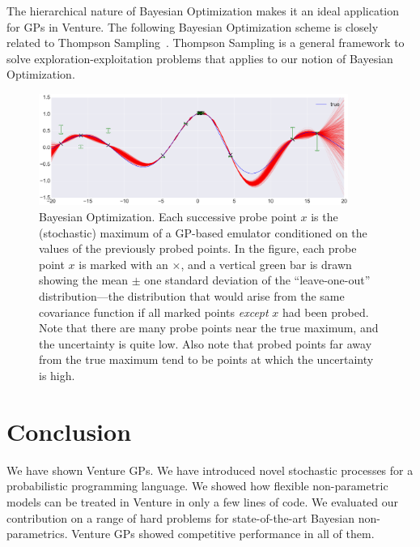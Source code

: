 \documentclass{article} %
\newcommand{\argmax}[1]{\underset{#1}{\operatorname{arg}\,\operatorname{max}}\;}
\begin{document}
The hierarchical nature of Bayesian Optimization makes it an ideal application for GPs in Venture. The following Bayesian Optimization scheme is closely related to Thompson Sampling~\cite{thompson1933likelihood}. Thompson Sampling is a general framework to solve exploration-exploitation problems that applies to our notion of Bayesian Optimization.

\begin{figure}
\centering
    \includegraphics[width=0.9\textwidth]{figs/BayesOpta.png}
    \caption{Bayesian Optimization.
      Each successive probe point $x$ is the (stochastic) maximum of a GP-based emulator conditioned on the values of the previously probed points.
      In the figure, each probe point $x$ is marked with an $\times$, and a vertical green bar is drawn showing the mean $\pm$ one standard deviation of the ``leave-one-out'' distribution---the distribution that would arise from the same covariance function if all marked points {\em except} $x$ had been probed.
      Note that there are many probe points near the true maximum, and the uncertainty is quite low.
      Also note that probed points far away from the true maximum tend to be points at which the uncertainty is high.}
    \label{fig:structureCo2}
\end{figure}




\section{Conclusion}
We have shown Venture GPs. We have introduced novel stochastic processes for a probabilistic programming language. We showed how flexible non-parametric models can be treated in Venture in only a few lines of code. We evaluated our contribution on a range of hard problems for state-of-the-art Bayesian non-parametrics. Venture GPs showed competitive performance in all of them. 


\newpage


\end{document}
